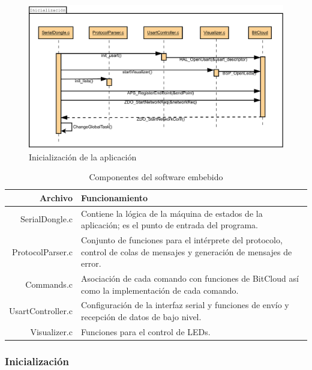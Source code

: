 \begin{figure}
	\centering
	\includegraphics[scale=0.35]{capitulo_3_imgs/Inicializacion.pdf}
	\caption{Inicialización de la aplicación}
	\label{fig:diagrama_inicializacion}
\end{figure}

\begin{table}
	\begin{center}
		\caption{Componentes del software embebido}
		\label{tabla:componentes_software}
		\small
		\begin{tabular}{r|m{7cm}}
			\toprule
			\textbf{Archivo} & \textbf{Funcionamiento}\\
			\midrule
			SerialDongle.c & Contiene la lógica de la máquina de estados de la aplicación; es el punto de entrada del programa. \\
			ProtocolParser.c & Conjunto de funciones para el intérprete del protocolo, control de colas de mensajes y generación de mensajes de error. \\
			Commands.c & Asociación de cada comando con funciones de BitCloud así como la implementación de cada comando. \\
			UsartController.c & Configuración de la interfaz serial y funciones de envío y recepción de datos de bajo nivel.\\
			Visualizer.c & Funciones para el control de LEDs.\\
			\bottomrule
		\end{tabular}
	\end{center}
\end{table}

\subsubsection{Inicialización}

